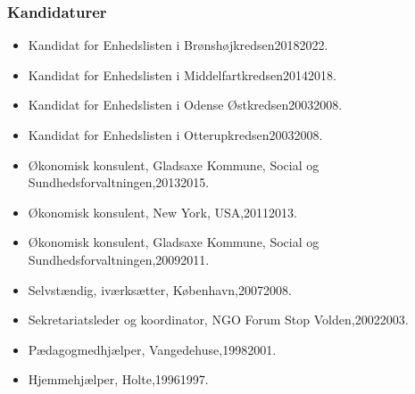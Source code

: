 \documentclass[11pt, a4paper]{awesome-cv}
\begin{document}
\begin{cvletter}
\subsubsection*{Kandidaturer}
\begin{itemize}
\item Kandidat for Enhedslisten i Brønshøjkredsen20182022.
\item Kandidat for Enhedslisten i Middelfartkredsen20142018.
\item Kandidat for Enhedslisten i Odense Østkredsen20032008.
\item Kandidat for Enhedslisten i Otterupkredsen20032008.
\end{itemize}
\begin{itemize}
\item Økonomisk konsulent, Gladsaxe Kommune, Social og Sundhedsforvaltningen,20132015.
\item Økonomisk konsulent, New York, USA,20112013.
\item Økonomisk konsulent, Gladsaxe Kommune, Social og Sundhedsforvaltningen,20092011.
\item Selvstændig, iværksætter, København,20072008.
\item Sekretariatsleder og koordinator, NGO Forum  Stop Volden,20022003.
\item Pædagogmedhjælper, Vangedehuse,19982001.
\item Hjemmehjælper, Holte,19961997.
\end{itemize}
\end{cvletter}
\end{document}
